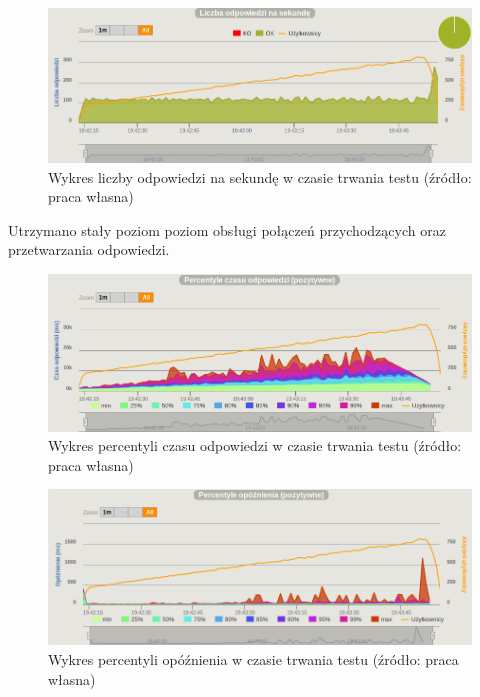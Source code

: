 \documentclass[12pt,twoside]{article}
\begin{document}
\begin{figure}[htbp]
\centering
\includegraphics[resolution=150]{test_results/elixir/file/screenshots/responses.png}
\caption{Wykres liczby odpowiedzi na sekundę w czasie trwania testu (źródło: praca własna)}
\end{figure}

Utrzymano stały poziom poziom obsługi połączeń przychodzących oraz
przetwarzania odpowiedzi.

\begin{figure}[htbp]
\centering
\includegraphics[resolution=150]{test_results/elixir/file/screenshots/response_percentile.png}
\caption{Wykres percentyli czasu odpowiedzi w czasie trwania testu (źródło: praca własna)}
\end{figure}

\begin{figure}[htbp]
\centering
\includegraphics[resolution=150]{test_results/elixir/file/screenshots/latency_percentile.png}
\caption{Wykres percentyli opóźnienia w czasie trwania testu (źródło: praca własna)}
\end{figure}
\end{document}
